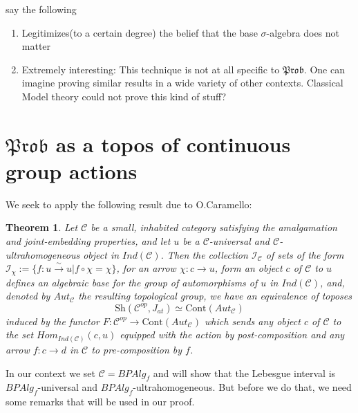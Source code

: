 \documentclass[a4paper]{amsproc}
\theoremstyle{plain}
\newtheorem{theorem}{Theorem}[section]
\theoremstyle{definition}
\theoremstyle{remark}
\numberwithin{equation}{section}
\begin{document}

say the following
\begin{enumerate}
    \item Legitimizes(to a certain degree) the belief that the base $\sigma$-algebra does not matter
    \item Extremely interesting: This technique is not at all specific to $\mathfrak{Prob}$. One can imagine proving similar results in a wide variety of other contexts. Classical Model theory could not prove this kind of stuff?
\end{enumerate}

\section{$\mathfrak{Prob}$ as a topos of continuous group actions}

We seek to apply the following result due to O.Caramello:

\begin{theorem}\label{olivia}
Let $\mathcal{C}$ be a small, inhabited category satisfying the amalgamation and joint-embedding properties, and let $u$ be a $\mathcal{C}$-universal and $\mathcal{C}$-ultrahomogeneous object in $Ind(\mathcal{C})$. Then the collection $\mathcal{I}_{\mathcal{C}}$ of sets of the form $\mathcal{I}_{\chi}:=\{f:u\overset{\sim}{\rightarrow} u| f\circ \chi=\chi\} $, for an arrow $\chi:c\rightarrow u$, form an object $c$ of $\mathcal{C}$ to $u$ defines an algebraic base for the group of automorphisms of $u$ in $Ind(\mathcal{C})$, and, denoted by $Aut_\mathcal{C}$ the resulting topological group, we have an equivalence of toposes
\[\text{Sh}(\mathcal{C}^{op},J_{at})\simeq \text{Cont}(Aut_\mathcal{C}) \]
induced by the functor $F:\mathcal{C}^{op}\rightarrow \text{Cont}(Aut_{\mathcal{C}})$ which sends any object $c$ of $\mathcal{C}$ to the set $Hom_{Ind(\mathcal{C})}(c,u)$ equipped with the action by post-composition and any arrow $f:c\rightarrow d$ in $\mathcal{C}$ to pre-composition by $f$.
\end{theorem}

In our context we set $\mathcal{C}=BPAlg_f$ and will show that the Lebesgue interval is $BPAlg_f$-universal and $BPAlg_f$-ultrahomogeneous. But before we do that, we need some remarks that will be used in our proof.
\end{document}
